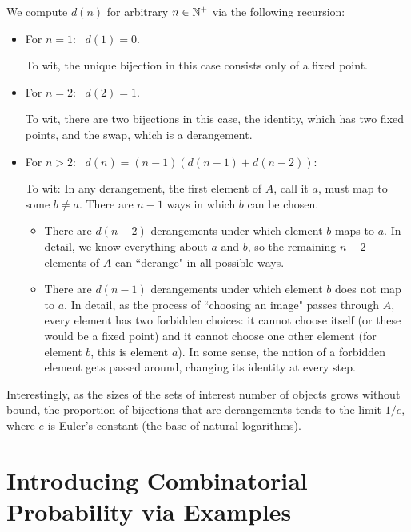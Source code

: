 We compute $d(n)$ for arbitrary $n \in \mathbb{N}^+$ via the following recursion:
\begin{itemize}
\item
For $n=1$:  \ $d(1) = 0$.

To wit, the unique bijection in this case consists only of a fixed point. 

\item
For $n=2$:  \ $d(2) = 1$.

To wit, there are two bijections in this case, the identity, which has two fixed points, and the swap,
which is a derangement.

\item
For $n > 2$: \ $d(n) = (n-1) (d(n-1) + d(n-2))$:

To wit: In any derangement, the first element of $A$, call it $a$, must map to some $b \neq a$.  There
are $n-1$ ways in which $b$ can be chosen.

\begin{itemize}
\item
There are $d(n-2)$ derangements under which element $b$ maps to $a$.  In detail, we know
everything about $a$ and $b$, so the remaining $n-2$ elements of $A$ can ``derange" in all
possible ways.

\item
There are $d(n-1)$ derangements under which element $b$ does not map to $a$.  In detail,
as the process of ``choosing an image" passes through $A$, every element has two forbidden
choices: it cannot choose itself (or these would be a fixed point) and it cannot choose one other
element (for element $b$, this is element $a$).  In some sense, the notion of a
forbidden element gets passed around, changing its identity at every step.
\end{itemize}
\end{itemize}

\medskip

Interestingly, as the sizes of the sets of interest number of objects grows without bound, the
proportion of bijections that are derangements tends to the limit $1/e$, where $e$ is Euler's
constant (the base of natural logarithms).



\section{Introducing Combinatorial Probability via Examples}
\label{sec:combinatorial-prob}


